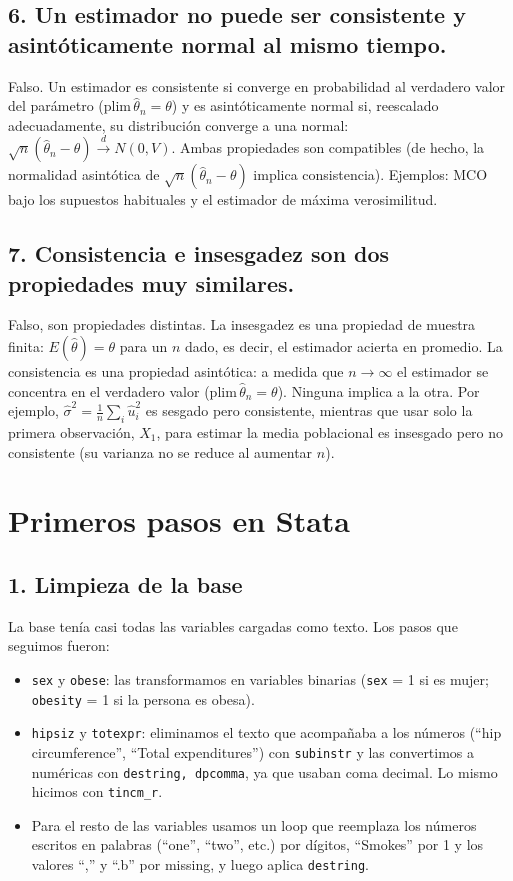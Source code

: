\documentclass[11pt,a4paper]{article}
\begin{document}
\subsection*{6. Un estimador no puede ser consistente y asintóticamente normal al mismo tiempo.}

Falso. Un estimador es consistente si converge en probabilidad al verdadero valor del parámetro ($\text{plim}\,\hat\theta_n=\theta$) y es asintóticamente normal si, reescalado adecuadamente, su distribución converge a una normal: $\sqrt{n}(\hat\theta_n-\theta)\xrightarrow{d}N(0,V)$. Ambas propiedades son compatibles (de hecho, la normalidad asintótica de $\sqrt{n}(\hat\theta_n-\theta)$ implica consistencia). Ejemplos: MCO bajo los supuestos habituales y el estimador de máxima verosimilitud.

\subsection*{7. Consistencia e insesgadez son dos propiedades muy similares.}

Falso, son propiedades distintas. La insesgadez es una propiedad de muestra finita: $E(\hat\theta)=\theta$ para un $n$ dado, es decir, el estimador acierta en promedio. La consistencia es una propiedad asintótica: a medida que $n\to\infty$ el estimador se concentra en el verdadero valor ($\text{plim}\,\hat\theta_n=\theta$). Ninguna implica a la otra. Por ejemplo, $\hat\sigma^2=\frac{1}{n}\sum_i\hat u_i^2$ es sesgado pero consistente, mientras que usar solo la primera observación, $X_1$, para estimar la media poblacional es insesgado pero no consistente (su varianza no se reduce al aumentar $n$).

\section*{Primeros pasos en Stata}

\subsection*{1. Limpieza de la base}

La base tenía casi todas las variables cargadas como texto. Los pasos que seguimos fueron:
\begin{itemize}
  \item \texttt{sex} y \texttt{obese}: las transformamos en variables binarias (\texttt{sex} = 1 si es mujer; \texttt{obesity} = 1 si la persona es obesa).
  \item \texttt{hipsiz} y \texttt{totexpr}: eliminamos el texto que acompañaba a los números (``hip circumference'', ``Total expenditures'') con \texttt{subinstr} y las convertimos a numéricas con \texttt{destring, dpcomma}, ya que usaban coma decimal. Lo mismo hicimos con \texttt{tincm\_r}.
  \item Para el resto de las variables usamos un loop que reemplaza los números escritos en palabras (``one'', ``two'', etc.) por dígitos, ``Smokes'' por 1 y los valores ``,'' y ``.b'' por missing, y luego aplica \texttt{destring}.
\end{itemize}
\end{document}

